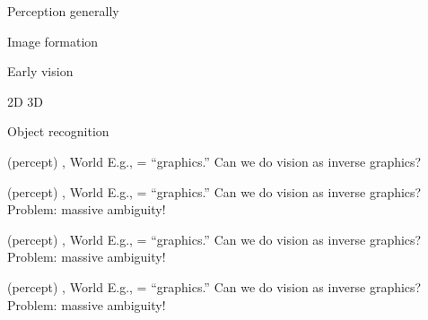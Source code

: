 \documentclass{article}
\begin{document}
\begin{huge}

\sf


\blob Perception generally

\blob Image formation

\blob Early vision

\blob 2D \mat{$\rightarrow$} 3D

\blob Object recognition





 (percept) , World 
\mat{\[
  S = g(W)
\]}%
E.g.,  = ``graphics.'' Can we do vision as inverse graphics?
\mat{\[
  W = g^{-1}(S)
\]}%


 (percept) , World 
\mat{\[
  S = g(W)
\]}%
E.g.,  = ``graphics.'' Can we do vision as inverse graphics?
\mat{\[
  W = g^{-1}(S)
\]}%
Problem: massive ambiguity!

\vspace*{0.2in}

\textwidth
{}


 (percept) , World 
\mat{\[
  S = g(W)
\]}%
E.g.,  = ``graphics.'' Can we do vision as inverse graphics?
\mat{\[
  W = g^{-1}(S)
\]}%
Problem: massive ambiguity!

\vspace*{0.2in}

\textwidth
{}


 (percept) , World 
\mat{\[
  S = g(W)
\]}%
E.g.,  = ``graphics.'' Can we do vision as inverse graphics?
\mat{\[
  W = g^{-1}(S)
\]}%
Problem: massive ambiguity!


\end{huge}
\end{document}
